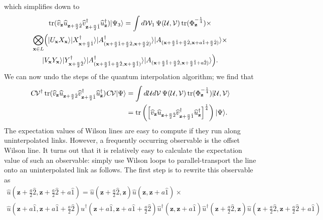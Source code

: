 \documentclass[12pt]{amsart}
\newcommand{\tr}{\operatorname{tr}}
\theoremstyle{definition}
\theoremstyle{remark}
\numberwithin{equation}{section}
\begin{document}
which simplifies down to
\begin{multline}	
	\tr(\widehat{v}_{\mathbf{z}}\widehat{u}_{\mathbf{z}+\frac{a}{2}\hat{2}}\widehat{v}^\dag_{\mathbf{z}+\frac{a}{2}\hat{1}}\widehat{u}_{\mathbf{z}}^\dag)|\Psi_3\rangle = \int  d\mathcal{W}_1 \, \Psi(\mathcal{U},\mathcal{V}) \tr(   \Phi_{\mathbf{z}}^{-\frac14}) \times\\\bigotimes_{\mathbf{x}\in L}\Bigl( 
	|U_\mathbf{x} X_\mathbf{x}\rangle|X^\dag_{\mathbf{x}+\frac{a}{2}\hat{1}}\rangle | A_{(\mathbf{x}+\frac{a}{2}\hat{1}+\frac{a}{2}\hat{2}, \mathbf{x}+\frac{a}{2}\hat{2})}^\dag   \rangle|A_{(\mathbf{x}+\frac{a}{2}\hat{1}+\frac{a}{2}\hat{2}, \mathbf{x}+{a}\hat{1}+\frac{a}{2}\hat{2})}\rangle \times \\ 
	|V_\mathbf{x} Y_\mathbf{x}\rangle|Y^\dag_{\mathbf{x}+\frac{a}{2}\hat{2}}\rangle|A_{(\mathbf{x}+\frac{a}{2}\hat{1}+\frac{a}{2}\hat{2}, \mathbf{x}+\frac{a}{2}\hat{1})}^\dag\rangle |A_{(\mathbf{x}+\frac{a}{2}\hat{1}+\frac{a}{2}\hat{2}, \mathbf{x}+\frac{a}{2}\hat{1}+{a}\hat{2})}\rangle \Bigr).
\end{multline}
We can now undo the steps of the quantum interpolation algorithm; we find that
\begin{equation}
\begin{split}	
	\textsl{C}\mathcal{V}^\dag\tr(\widehat{v}_{\mathbf{z}}\widehat{u}_{\mathbf{z}+\frac{a}{2}\hat{2}}\widehat{v}^\dag_{\mathbf{z}+\frac{a}{2}\hat{1}}\widehat{u}_{\mathbf{z}}^\dag)\textsl{C}\mathcal{V}|\Psi\rangle &= \int  d\mathcal{U}d\mathcal{V} \, \Psi(\mathcal{U},\mathcal{V}) \tr(   \Phi_{\mathbf{z}}^{-\frac14}) |\mathcal{U},\mathcal{V}\rangle \\
	&= \tr\left( \left[\widehat{v}_{\mathbf{z}}\widehat{u}_{\mathbf{z}+\frac{a}{2}\hat{2}}\widehat{v}^\dag_{\mathbf{z}+\frac{a}{2}\hat{1}}\widehat{u}_{\mathbf{z}}^\dag\right]^{\frac14}\right)|\Psi\rangle.
\end{split}
\end{equation}
The expectation values of Wilson lines are easy to compute if they run along uninterpolated links. However, a frequently occurring observable is the offset Wilson line. It turns out that it is relatively easy to calculate the expectation value of such an observable: simply use Wilson loops to parallel-transport the line onto an uninterpolated link as follows. The first step is to rewrite this observable as
\begin{multline}
	\widehat{u}(\mathbf{z}+\tfrac{a}{2}\hat{2},\mathbf{z}+\tfrac{a}{2}\hat{2}+a\hat{1}) = \widehat{u}(\mathbf{z}+\tfrac{a}{2}\hat{2},\mathbf{z})\widehat{u}(\mathbf{z},\mathbf{z}+a\hat{1}) \times \\   \widehat{u}(\mathbf{z}+a\hat{1},\mathbf{z}+a\hat{1}+\tfrac{a}{2}\hat{2})\widehat{u}^\dag(\mathbf{z}+a\hat{1},\mathbf{z}+a\hat{1}+\tfrac{a}{2}\hat{2})\widehat{u}^\dag(\mathbf{z},\mathbf{z}+a\hat{1})\widehat{u}^\dag(\mathbf{z}+\tfrac{a}{2}\hat{2},\mathbf{z})\widehat{u}(\mathbf{z}+\tfrac{a}{2}\hat{2}, \mathbf{z}+\tfrac{a}{2}\hat{2}+a\hat{1})
\end{multline}
\end{document}
